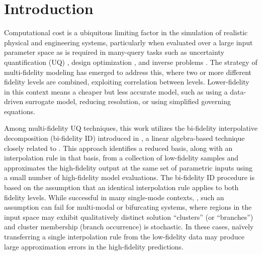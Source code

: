 \documentclass[preprint,10pt]{elsarticle}
\begin{document}
\section{Introduction}
\label{sec:introduction}

Computational cost is a ubiquitous limiting factor in the simulation of realistic physical and engineering systems, particularly when evaluated over a large input parameter space as is required in many-query tasks such as uncertainty quantification (UQ) \cite{doostan2009least,doostan2011non,zhang2021modern}, design optimization \cite{queipo2005surrogate}, and inverse problems \cite{hasanouglu2021introduction}. The strategy of multi-fidelity modeling \cite{peherstorfer2018survey, ng2012multifidelity, giles2015multilevel} has emerged to address this, where two or more different fidelity levels are combined, exploiting correlation between levels. Lower-fidelity in this context means a cheaper but less accurate model, such as using a data-driven surrogate model, reducing resolution, or using simplified governing equations. 

Among multi-fidelity UQ techniques, this work utilizes the bi-fidelity interpolative decomposition  (bi-fidelity ID) introduced in \cite{doostan2016bi,hampton2018}, a linear algebra-based technique closely related to \cite{doostan2007stochastic,narayan2014stochastic,newberry2022bi}. This approach identifies a reduced basis, along with an interpolation rule in that basis, from a collection of low-fidelity samples and approximates the high-fidelity output at the same set of parametric inputs using a small number of high-fidelity model evaluations. The bi-fidelity ID procedure is based on the assumption that an identical interpolation rule applies to both fidelity levels.
While successful in many single-mode contexts, \cite{fairbanks2020bi,fairbanks2017low,skinner2019reduced,pinti2022multi}, such an assumption can fail for multi-modal or bifurcating systems, where regions in the input space may exhibit qualitatively distinct solution ``clusters'' (or ``branches'') and cluster membership (branch occurrence) is stochastic. In these cases, naïvely transferring a single interpolation rule from the low-fidelity data may produce large approximation errors in the high-fidelity predictions.
\end{document}
